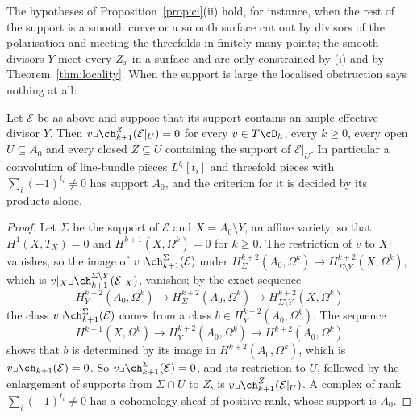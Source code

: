The hypotheses of Proposition~\ref{prop:ci}(ii) hold, for instance, when the rest of the support is a smooth curve or a smooth surface cut out by divisors of the polarisation and meeting the threefolds in finitely many points; the smooth divisors $Y$ meet every $Z_{x}$ in a surface and are only constrained by (i) and by Theorem~\ref{thm:locality}. When the support is large the localised obstruction says nothing at all:

\begin{proposition}\label{prop:stops}
Let $\mathcal{E}$ be as above and suppose that its support contains an ample effective divisor $Y$. Then $v\lrcorner\ch^{Z}_{k+1}(\mathcal{E}|_{U})=0$ for every $v\in T\cD_{h}$, every $k\ge0$, every open $U\subseteq A_{0}$ and every closed $Z\subseteq U$ containing the support of $\mathcal{E}|_{U}$. In particular a convolution of line-bundle pieces $L^{l_{i}}[t_{i}]$ and threefold pieces with $\sum_{i}(-1)^{t_{i}}\ne0$ has support $A_{0}$, and the criterion for it is decided by its products alone.
\end{proposition}

\begin{proof}
Let $\Sigma$ be the support of $\mathcal{E}$ and $X=A_{0}\setminus Y$, an affine variety, so that $H^{1}(X,T_{X})=0$ and $H^{k+1}(X,\Omega^{k})=0$ for $k\ge0$. The restriction of $v$ to $X$ vanishes, so the image of $v\lrcorner\ch^{\Sigma}_{k+1}(\mathcal{E})$ under $H^{k+2}_{\Sigma}(A_{0},\Omega^{k})\to H^{k+2}_{\Sigma\setminus Y}(X,\Omega^{k})$, which is $v|_{X}\lrcorner\ch^{\Sigma\setminus Y}_{k+1}(\mathcal{E}|_{X})$, vanishes; by the exact sequence
\[
H^{k+2}_{Y}(A_{0},\Omega^{k})\to H^{k+2}_{\Sigma}(A_{0},\Omega^{k})\to H^{k+2}_{\Sigma\setminus Y}(X,\Omega^{k})
\]
the class $v\lrcorner\ch^{\Sigma}_{k+1}(\mathcal{E})$ comes from a class $b\in H^{k+2}_{Y}(A_{0},\Omega^{k})$. The sequence
\[
H^{k+1}(X,\Omega^{k})\to H^{k+2}_{Y}(A_{0},\Omega^{k})\to H^{k+2}(A_{0},\Omega^{k})
\]
shows that $b$ is determined by its image in $H^{k+2}(A_{0},\Omega^{k})$, which is $v\lrcorner\ch_{k+1}(\mathcal{E})=0$. So $v\lrcorner\ch^{\Sigma}_{k+1}(\mathcal{E})=0$, and its restriction to $U$, followed by the enlargement of supports from $\Sigma\cap U$ to $Z$, is $v\lrcorner\ch^{Z}_{k+1}(\mathcal{E}|_{U})$. A complex of rank $\sum_{i}(-1)^{t_{i}}\ne0$ has a cohomology sheaf of positive rank, whose support is $A_{0}$.
\end{proof}

